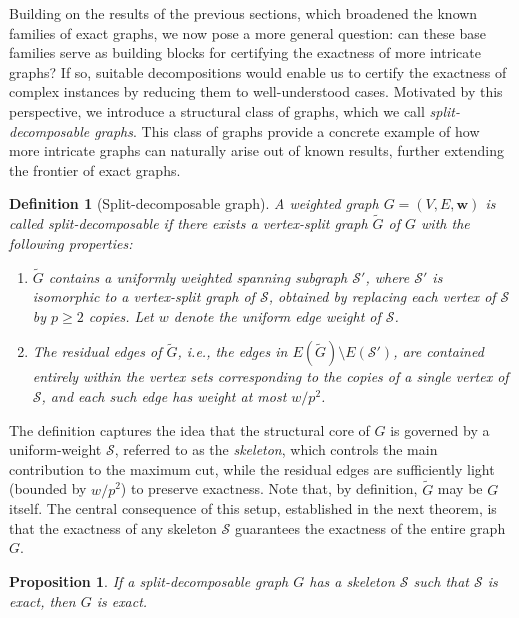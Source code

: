 \documentclass[a4paper,fleqn]{cas-sc}
\newcommand{\1}{\mathbf{1}}
\newtheorem{proposition}[theorem]{Proposition}
\newtheorem{definition}[theorem]{Definition}
\begin{document}
Building on the results of the previous sections, which broadened the known families of exact graphs, we now pose a more general question: can these base families serve as building blocks for certifying the exactness of more intricate graphs? If so, suitable decompositions would enable us to
certify the exactness of complex instances by reducing them to well-understood cases.
Motivated by this perspective, we introduce a structural class of graphs, which we call
\textit{split-decomposable graphs}.
This class of graphs provide a concrete example of how more intricate graphs can naturally arise
out of known results, further extending the frontier of exact graphs.
\begin{definition}[Split-decomposable graph]
A weighted graph $G=(V,E,\mathbf{w})$ is called \emph{split-decomposable} if there exists 
a vertex-split graph $\widetilde{G}$ of $G$ with the following properties:
\begin{enumerate}
    \item $\widetilde{G}$ contains a uniformly weighted spanning subgraph $\mathcal{S}'$, where $\mathcal{S}'$ is isomorphic to a vertex-split graph of $\mathcal{S}$, obtained by replacing each vertex of $\mathcal{S}$ by $p \geq 2$ copies. Let $w$ denote the uniform edge weight of $\mathcal{S}$. 
    
    \item The residual edges of $\widetilde{G}$, i.e., the edges in $E(\widetilde{G}) \setminus E(\mathcal{S}')$, are contained entirely within the vertex sets corresponding to the copies of a single vertex of $\mathcal{S}$, and each such edge has weight at most $w/p^{2}$. 
\end{enumerate}
\end{definition}

The definition captures the idea that the structural core of $G$ is governed by a uniform-weight $\mathcal{S}$, referred to as the \textit{skeleton}, which controls the main contribution to the maximum cut, while the residual edges are sufficiently light (bounded by $w/p^{2}$) to preserve exactness. Note that, by definition, $\widetilde{G}$ may be $G$ itself. The central consequence of this setup, established in the next theorem, is that the exactness of any skeleton $\mathcal{S}$ guarantees the exactness of the entire graph $G$. %

\begin{proposition}\label{thm:splitexact}
If a split-decomposable graph $G$ has a skeleton $\mathcal S$ such that $\mathcal S$ is exact, then $G$ is exact.    
\end{proposition}
\end{document}
